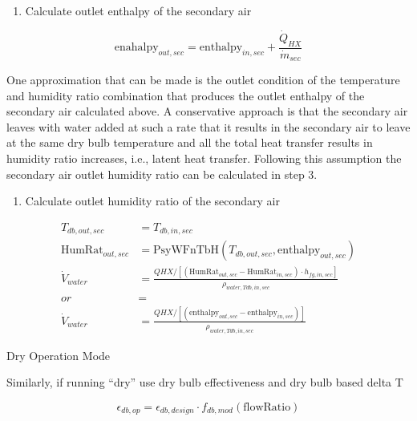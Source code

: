 \begin{enumerate}
\def\labelenumi{\arabic{enumi}.}
\setcounter{enumi}{1}
\tightlist
\item
  Calculate outlet enthalpy of the secondary air
\end{enumerate}

\begin{equation}
\text{enahalpy}_{out,sec} = \text{enthalpy}_{in,sec} + \frac{\dot{Q}_{HX}}{\dot{m}_{sec}}
\end{equation}

One approximation that can be made is the outlet condition of the temperature and humidity ratio combination that produces the outlet enthalpy of the secondary air calculated above. A conservative approach is that the secondary air leaves with water added at such a rate that it results in the secondary air to leave at the same dry bulb temperature and all the total heat transfer results in humidity ratio increases, i.e., latent heat transfer. Following this assumption the secondary air outlet humidity ratio can be calculated in step 3.

\begin{enumerate}
\def\labelenumi{\arabic{enumi}.}
\setcounter{enumi}{2}
\tightlist
\item
  Calculate outlet humidity ratio of the secondary air
\end{enumerate}

\begin{equation}
  \begin{array}{rl}
    T_{db,out,sec} & = T_{db,in,sec} \\
    \text{HumRat}_{out,sec} & = \text{PsyWFnTbH}\left(T_{db,out,sec},\text{enthalpy}_{out,sec}\right) \\
    \dot{V}_{water} & = \frac{QHX / \left[ \left(\text{HumRat}_{out,sec}-\text{HumRat}_{in,sec}\right) \cdot h_{fg,in,sec}\right]}{\rho_{water,Tdb,in,sec}} \\
    or & = \\
    \dot{V}_{water} & = \frac{QHX / \left[ \left(\text{enthalpy}_{out,sec}-\text{enthalpy}_{in,sec}\right) \right]}{\rho_{water,Tdb,in,sec}}
  \end{array}
\end{equation}

Dry Operation Mode

Similarly, if running ``dry'' use dry bulb effectiveness and dry bulb based delta T

\begin{equation}
\epsilon_{db,op} = \epsilon_{db,design} \cdot f_{db,mod}\left(\text{flowRatio}\right)
\end{equation}

